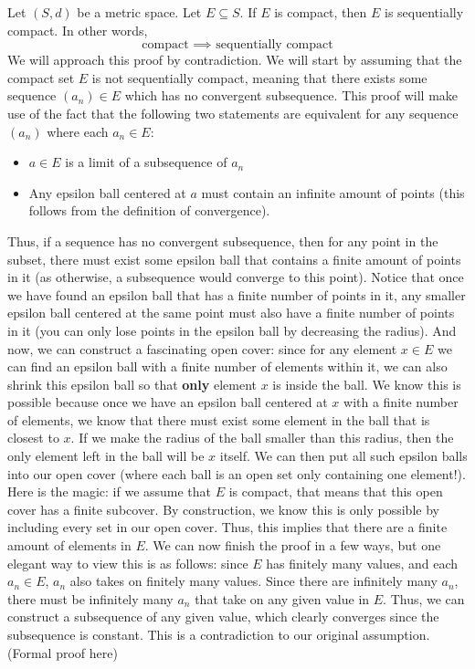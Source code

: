 \begin{thm}{}{}
Let \((S, d)\) be a metric space. Let \(E \subseteq S\). \newline 
If \(E\) is compact, then \(E\) is sequentially compact. In other words, 
\begin{equation*}
  \textrm{compact \(\implies\) sequentially compact}
\end{equation*}
We will approach this proof by contradiction. We will start by assuming that the compact set \(E\) is not sequentially compact, meaning that there exists some sequence \((a_n) \in E\) which has no convergent subsequence.
This proof will make use of the fact that the following two statements are equivalent for any sequence \((a_n)\) where each \(a_n \in E\): 
\begin{itemize}
  \item \(a \in E\) is a limit of a subsequence of \(a_n\)
  \item  Any epsilon ball centered at \(a\) must contain an infinite amount of points (this follows from the definition of convergence).
\end{itemize}
Thus, if a sequence has no convergent subsequence, then for any point in the subset, there must exist some epsilon ball that contains a finite amount of points in it (as otherwise, a subsequence would converge to this point). Notice that once we have found an epsilon ball that has a finite number of points in it, any smaller epsilon ball centered at the same point must also have a finite number of points in it (you can only lose points in the epsilon ball by decreasing the radius). And now, we can construct a fascinating open cover: since for any element \(x \in E\) we can find an epsilon ball with a finite number of elements within it, we can also shrink this epsilon ball so that \textbf{only} element \(x\) is inside the ball. We know this is possible because once we have an epsilon ball centered at \(x\) with a finite number of elements, we know that there must exist some element in the ball that is closest to \(x\). If we make the radius of the ball smaller than this radius, then the only element left in the ball will be \(x\) itself. We can then put all such epsilon balls into our open cover (where each ball is an open set only containing one element!). Here is the magic: if we assume that \(E\) is compact, that means that this open cover has a finite subcover. By construction, we know this is only possible by including every set in our open cover. Thus, this implies that there are a finite amount of elements in \(E\). We can now finish the proof in a few ways, but one elegant way to view this is as follows: since \(E\) has finitely many values, and each \(a_n \in E\), \(a_n\) also takes on finitely many values. Since there are infinitely many \(a_n\), there must be infinitely many \(a_n\) that take on any given value in \(E\). Thus, we can construct a subsequence of any given value, which clearly converges since the subsequence is constant. This is a contradiction to our original assumption. (Formal proof here)%


\end{thm}
